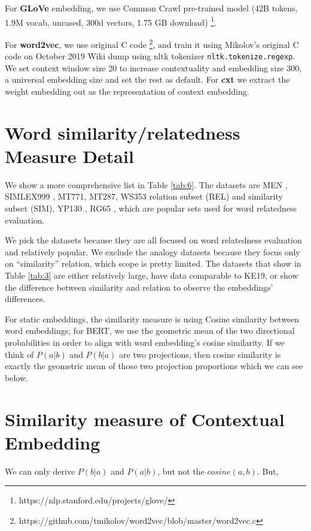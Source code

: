 \documentclass[letterpaper]{article} %
\begin{document}
For \textbf{GLoVe} embedding, we use Common Crawl pre-trained model (42B tokens, 1.9M vocab, uncased, 300d vectors, 1.75 GB download) \footnote{https://nlp.stanford.edu/projects/glove/}. 

For \textbf{word2vec}, we use original C code \footnote{https://github.com/tmikolov/word2vec/blob/master/word2vec.c}, and train it using Mikolov's \cite{mikolov2013distributed} original C code on October 2019 Wiki dump using nltk tokenizer \texttt{nltk.tokenize.regexp}. We set context window size 20 to increase contextuality and embedding size 300, a universal embedding size and set the rest as default. For \textbf{cxt} we extract the weight embedding out as the representation of context embedding.

\section{Word similarity/relatedness Measure Detail} We show a more comprehensive list in Table \ref{tab:6}. The datasets are MEN \cite{bruni2014multimodal}, SIMLEX999 \cite{hill2015simlex}, MT771, MT287, WS353 \cite{finkelstein2002placing} relation subset (REL) and similarity subset (SIM), YP130 \cite{yang2006verb}, RG65 \cite{rubenstein1965contextual}, which are popular sets used for word relatedness evaluation. 

We pick the datasets because they are all focused on word relatedness evaluation and relatively popular. We exclude the analogy datasets because they focus only on ``similarity'' relation, which scope is pretty limited. The datasets that show in Table \ref{tab:3} are either relatively large, have data comparable to KE19\cite{Ethayarajh2019HowCA}, or show the difference between similarity and relation to observe the embeddings' differences.

For static embeddings, the similarity measure is using Cosine similarity between word embeddings; for BERT, we use the geometric mean of the two directional probabilities in order to align with word embedding's cosine similarity. If we think of $P(a|b)$ and $P(b|a)$ are two projections, then cosine similarity is exactly the geometric mean of those two projection proportions which we can see below.

\section{Similarity measure of Contextual Embedding}
We can only derive $P(b|a)$ and $P(a|b)$, but not the $cosine(a,b)$. But,
\end{document}
